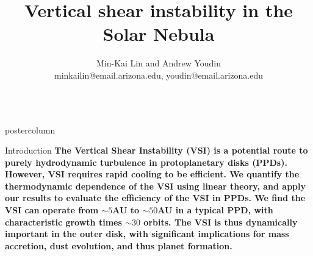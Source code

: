 \documentclass[final,hyperref={pdfpagelabels=false}]{beamer}
\title{{\huge Vertical shear instability in the Solar Nebula}}
\author{Min-Kai Lin and Andrew Youdin
  \\\vspace{1cm} \small{minkailin@email.arizona.edu, youdin@email.arizona.edu}}
\institute[UA]{Steward Observatory, 933 N Cherry Avenue,
  Tucson, AZ, 85721, USA}
\newlength{\columnheight}
\begin{document}
\captionsetup[subfigure]{labelformat=empty}

\begin{frame}
  \begin{columns}
    \begin{column}{.49\textwidth}
      \begin{beamercolorbox}[center,wd=\textwidth]{postercolumn}
        \begin{minipage}[T]{.95\textwidth}  %
          \parbox[t][\columnheight]{\textwidth}{ %
            \begin{block}{{\Large Introduction}}
              \justifying
              {\large              
                {\bf
                  The Vertical Shear Instability (VSI) is a potential
                  route to purely hydrodynamic turbulence in 
                  protoplanetary disks (PPDs). However, VSI requires rapid
                  cooling to be efficient.  We quantify the
                  thermodynamic dependence of the VSI using linear
                  theory, and apply our results to evaluate the
                  efficiency of the VSI in PPDs. We find the VSI can operate
                  from $\sim 5$AU to $\sim 50$AU in a typical PPD, with
                  characteristic growth times $\sim 30$ orbits. The
                  VSI is thus dynamically important in the outer disk,
                  with significant implications for mass accretion,
                  dust evolution, and thus planet formation. 
                }
              }
            \end{block}
            
}
\end{minipage}
\end{beamercolorbox}
\end{column}
\end{columns}
\end{frame}
\end{document}
